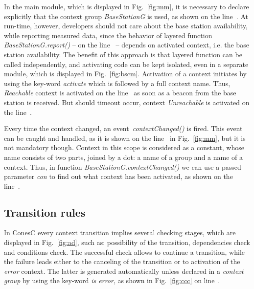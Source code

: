 
In the main module, which is displayed in Fig.~\ref{fig:mm}, it is necessary to declare
explicitly that the context group \emph{BaseStationG} is used, as shown on the line~.
At run-time, however, developers should not care about the base station availability, while
reporting measured data, since the behavior of layered function
\emph{BaseStationG.report()} -- on the line~ -- depends on activated
context, i.e. the base station availability. The benefit of
this approach is that layered function can be called independently, and activating code
can be kept isolated, even in a separate module, which is displayed in Fig.~\ref{fig:bscm}.
Activation of a context initiates by using the key-word
\emph{activate} which is followed by a full context name. Thus,
\emph{Reachable} context is activated on the line~ as soon as a
beacon from the base station is received. But should timeout occur, context
\emph{Unreachable} is activated on the line~.



Every time the context changed, an event~\emph{contextChanged()} is fired. This event can be
caught and handled, as it is shown on the line~ in Fig.~\ref{fig:mm},
but it is not mandatory though. Context in this scope is considered as a constant,
whose name consists of two parts, joined by a dot: a name of a group and a name
of a context. Thus, in function \emph{BaseStationG.contextChanged()} we can use
a passed parameter \emph{con} to find out what context has been activated, as
shown on the line~.

\subsection{Transition rules}\label{subsec:rules}

In ConesC every context transition implies several checking stages, which are displayed in
Fig.~\ref{fig:ad}, such as: possibility of the transition, dependencies check and conditions
check. The successful check allows to continue a transition, while the failure leads either to
the canceling of the transition or to activation of the \emph{error} context. The latter is generated
automatically unless declared in a \emph{context group} by using the key-word \emph{is error},
as shown in Fig.~\ref{fig:ccc} on line~.

